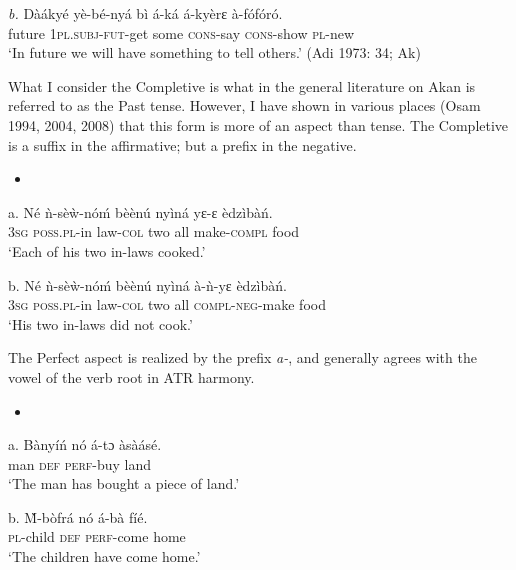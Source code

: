 \documentclass[output=paper]{langsci/langscibook}
\begin{document}
\gll \emph{b.  }D\`{a}\'{a}ky\'{e} y\`{e}-b\'{e}-ny\'{a}    b\`{i}  \'{a}-k\'{a}    \'{a}-ky\`{e}rɛ    \`{a}-f\'{o}f\'{o}r\'{o}.  \\
       future   \textsc{1pl.subj}{}-\textsc{fut}{}-get  some  \textsc{cons}{}-say\textsc{   cons}{}-show  \textsc{pl}{}-new\\
\glt    ‘In future we will have something to tell others.’ (Adi 1973: 34; Ak)
\z

What I consider the Completive is what in the general literature on Akan is referred to as the Past tense. However, I have shown in various places (Osam 1994, 2004, 2008) that this form is more of an aspect than tense. The Completive is a suffix in the affirmative; but a prefix in the negative.  

\begin{itemize}
\item \end{itemize}
\gll \textup{a.}  N\'{e}  \`{n}-s\`{e}\`{w}-n\'{o}\'{m}    b\`{e}\`{e}n\'{u}   ny\`{i}n\'{a}  yɛ-ɛ    \`{e}dz\`{i}b\`{a}\'{n}.\\
     \textsc{\textup{  }}\textsc{\textup{3sg}}   \textsc{poss.pl}{}-in law-\textsc{col}  two   all  make-\textsc{compl}  food\\
\glt ‘Each of his two in-laws cooked.’ \citep[57]{Krampah1970}
\z

\gll \textup{b.  }N\'{e}  \`{n}-s\`{e}\`{w}-n\'{o}\'{m}    b\`{e}\`{e}n\'{u}   ny\`{i}n\'{a}  \`{a}-\`{n}-yɛ      \`{e}dz\`{i}b\`{a}\'{n}.\\
     \textsc{  3sg}   \textsc{poss.pl}{}-in law-\textsc{col}  two  all  \textsc{compl-neg}{}-make  food\\
\glt ‘His two in-laws did not cook.’
\z

The Perfect aspect is realized by the prefix \emph{a-}, and generally agrees with the vowel of the verb root in ATR harmony.

\begin{itemize}
\item \end{itemize}
\gll \textup{a.}  B\`{a}ny\'{i}\'{n} n\'{o}  \'{a}-tɔ     \`{a}s\`{a}\'{a}s\'{e}.\\
       man  \textsc{def}  \textsc{perf}{}-buy  land\\
\glt ‘The man has bought a piece of land.’
\z

\gll \textup{b.  }\`{M}-b\`{o}fr\'{a}  n\'{o}  \'{a}-b\`{a}    f\'{i}\'{e}.\\
     \textsc{  pl}{}-child  \textsc{def}  \textsc{perf}{}-come  home\\
\glt ‘The children have come home.’
\z
\end{document}
